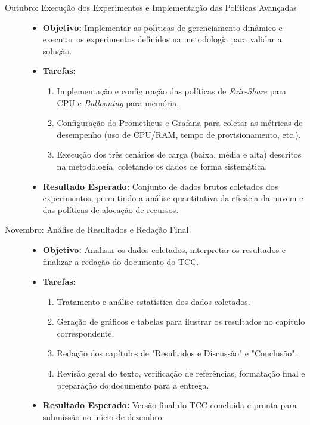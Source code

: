 \begin{description}
    \item[Outubro: Execução dos Experimentos e Implementação das Políticas Avançadas]
    \begin{itemize}
        \item \textbf{Objetivo:} Implementar as políticas de gerenciamento dinâmico e executar os experimentos definidos na metodologia para validar a solução.
        \item \textbf{Tarefas:}
        \begin{enumerate}
            \item Implementação e configuração das políticas de \textit{Fair-Share} para CPU e \textit{Ballooning} para memória.
            \item Configuração do Prometheus e Grafana para coletar as métricas de desempenho (uso de CPU/RAM, tempo de provisionamento, etc.).
            \item Execução dos três cenários de carga (baixa, média e alta) descritos na metodologia, coletando os dados de forma sistemática.
        \end{enumerate}
        \item \textbf{Resultado Esperado:} Conjunto de dados brutos coletados dos experimentos, permitindo a análise quantitativa da eficácia da nuvem e das políticas de alocação de recursos.
    \end{itemize}

    \item[Novembro: Análise de Resultados e Redação Final]
    \begin{itemize}
        \item \textbf{Objetivo:} Analisar os dados coletados, interpretar os resultados e finalizar a redação do documento do TCC.
        \item \textbf{Tarefas:}
        \begin{enumerate}
            \item Tratamento e análise estatística dos dados coletados.
            \item Geração de gráficos e tabelas para ilustrar os resultados no capítulo correspondente.
            \item Redação dos capítulos de "Resultados e Discussão" e "Conclusão".
            \item Revisão geral do texto, verificação de referências, formatação final e preparação do documento para a entrega.
        \end{enumerate}
        \item \textbf{Resultado Esperado:} Versão final do TCC concluída e pronta para submissão no início de dezembro.
    \end{itemize}
\end{description}